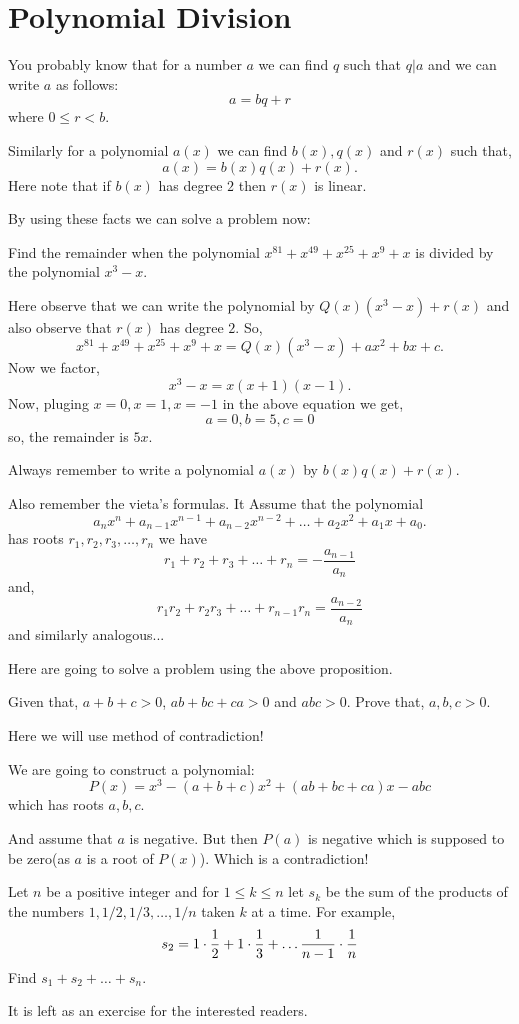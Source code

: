 \section{Polynomial Division}
You probably know that for a number $a$ we can find $q$ such that $q|a$ and we can write $a$ as follows:
\[a=bq+r\] where $0\le r<b$.

Similarly for a polynomial $a(x)$ we can find $b(x), q(x)$ and $r(x)$ such that,
\[a(x)=b(x)q(x) +r(x).\]
Here note that if $b(x)$ has degree $2$ then $r(x)$ is linear.

By using these facts we can solve a problem now:
\begin{example}
Find the remainder when the polynomial $x^{81}+x^{49}+x^{25}+x^9 +x$ is divided by the polynomial $x^3-x$.
\end{example}
 Here observe that we can write the polynomial by $Q(x)(x^3-x) +r(x)$ and also observe that $r(x)$ has degree $2$.
 So,
 \[x^{81}+x^{49}+x^{25}+x^9 +x=Q(x)(x^3-x) +ax^2+bx+c.\]
 Now we factor, \[x^3-x=x(x+1)(x-1).\]
 Now, pluging $x=0, x=1, x=-1$ in the above equation we get, \[a=0, b=5, c=0\]
 so, the remainder is $5x$.


 Always remember to write a polynomial $a(x)$ by $b(x)q(x)+r(x)$.

 Also remember the vieta's formulas. It  Assume that the polynomial 
 \[a_nx^n + a_{n-1}x^{n-1} + a_{n-2}x^{n-2}+ \ldots + a_2x^2 + a_1x + a_0 .\]
 has roots $r_1, r_2, r_3, \ldots , r_n$
  we have 
  \[ r_1+r_2+r_3+\ldots + r_n =-\frac{a_{n-1}}{a_n}\]
 and, \[r_1r_2 +r_2r_3 +\ldots +r_{n-1}r_n=\frac{a_{n-2}}{a_n}\]
 and similarly analogous...

 Here are going to solve a problem using the above proposition.

\begin{example}
Given that, $a+b+c>0$, $ab+bc+ca>0$ and $abc>0$. Prove that, $a,b,c>0$.
\end{example}
Here we will use method of contradiction!

We are going to construct a polynomial:
\[P(x)=x^3 -(a+b+c)x^2+(ab+bc+ca)x-abc\]
which has roots $a,b,c$.

And assume that $a$ is negative. But then $P(a)$ is negative which is supposed to be zero(as $a$ is a root of $P(x)$). Which is a contradiction!


\begin{example}
Let $n$ be a positive integer and for $1\le k \le n$ let $s_k$ be the sum of the products of the numbers $1, 1/2, 1/3,\ldots, 1/n$ taken $k$ at a time.
For example,
\[s_2 = 1\cdot \frac{1}{2} + 1 \cdot \frac{1}{3} + \ldots \frac{1}{n-1}\cdot \frac{1}{n}\]
Find $s_1 +s_2 +\ldots + s_n$.
\end{example}
It is left as an exercise for the interested readers.

